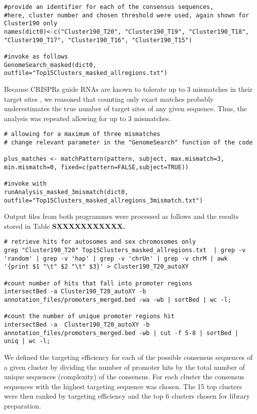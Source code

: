 \begin{footnotesize}
\begin{lstlisting}
#provide an identifier for each of the consensus sequences,
#here, cluster number and chosen threshold were used, again shown for Cluster190 only
names(dict0)<-c("Cluster190_T20", "Cluster190_T19", "Cluster190_T18", "Cluster190_T17", "Cluster190_T16", "Cluster190_T15")

#invoke as follows
GenomeSearch_masked(dict0, outfile="Top15Clusters_masked_allregions.txt")
\end{lstlisting}

Because CRISPRs guide RNAs are known to tolerate up to 3 mismatches in their target sites \cite{Mali:2013ft}, we reasoned that counting only exact matches probably underestimates the true number of target sites of any given sequence. Thus, the analysis was repeated allowing for up to 3 mismatches.

\begin{lstlisting}
# allowing for a maximum of three mismatches
# change relevant parameter in the "GenomeSearch" function of the code

plus_matches <- matchPattern(pattern, subject, max.mismatch=3, min.mismatch=0, fixed=c(pattern=FALSE,subject=TRUE))

#invoke with 
runAnalysis_masked_3mismatch(dict0, outfile="Top15Clusters_masked_allregions_3mismatch.txt")
\end{lstlisting}

Output files from both programmes were processed as follows and the results stored in Table\textbf{ SXXXXXXXXXXX.}

\begin{lstlisting}
# retrieve hits for autosomes and sex chromosomes only
grep "Cluster190_T20" Top15Clusters_masked_allregions.txt  | grep -v 'random' | grep -v 'hap' | grep -v 'chrUn' | grep -v chrM | awk '{print $1 "\t" $2 "\t" $3}' > Cluster190_T20_autoXY 

#count number of hits that fall into promoter regions
intersectBed -a Cluster190_T20_autoXY -b annotation_files/promoters_merged.bed -wa -wb | sortBed | wc -l;    

#count the number of unique promoter regions hit
intersectBed -a  Cluster190_T20_autoXY -b  annotation_files/promoters_merged.bed -wb | cut -f 5-8 | sortBed | uniq | wc -l;
\end{lstlisting}

We defined the targeting efficiency for each of the possible consensus sequences of a given cluster by dividing the number of promoter hits by the total number of unique sequences (complexity) of the consensus. For each cluster the consensus sequences with the highest targeting sequence was chosen. The 15 top clusters were then ranked by targeting efficiency and the top 6 clusters chosen for library preparation.

\end{footnotesize}
